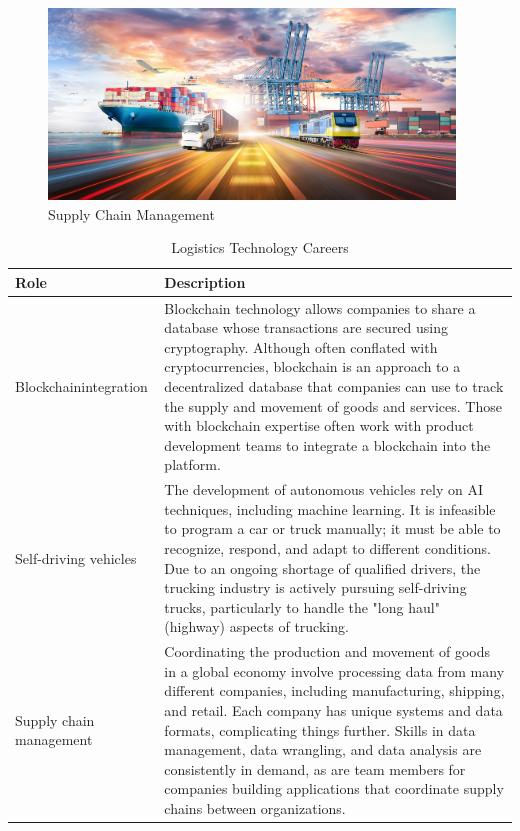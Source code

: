 
\begin{figure}[H]
	\begin{center}
		\caption{Supply Chain Management}
		\vskip 4pt
		\includegraphics[height=2in]{images/careers/iStock-1399747292.small.jpg}
	\end{center}
\end{figure}

\begin{table}[H]
	\begin{center}
		\caption{Logistics Technology Careers}
		\vskip 4pt
		\begin{tabular}{p{1in}|p{3.4in}} 
			\textbf{Role} & \textbf{Description}\\
			\hline
			Blockchain\linebreak integration & Blockchain technology allows companies to share a database whose transactions are secured using cryptography. Although often conflated with cryptocurrencies, blockchain is an approach to a decentralized database that companies can use to track the supply and movement of goods and services. Those with blockchain expertise often work with product development teams to integrate a blockchain into the platform.\\
			\hline
			Self-driving vehicles & The development of autonomous vehicles rely on AI techniques, including machine learning. It is infeasible to program a car or truck manually; it must be able to recognize, respond, and adapt to different conditions. Due to an ongoing shortage of qualified drivers, the trucking industry is actively pursuing self-driving trucks, particularly to handle the "long haul" (highway) aspects of trucking.\\
			\hline
			Supply chain management & Coordinating the production and movement of goods in a global economy involve processing data from many different companies, including manufacturing, shipping, and retail. Each company has unique systems and data formats, complicating things further. Skills in data management, data wrangling, and data analysis are consistently in demand, as are team members for companies building applications that coordinate supply chains between organizations.\\
			\hline
		\end{tabular}
	\end{center}
\end{table}

